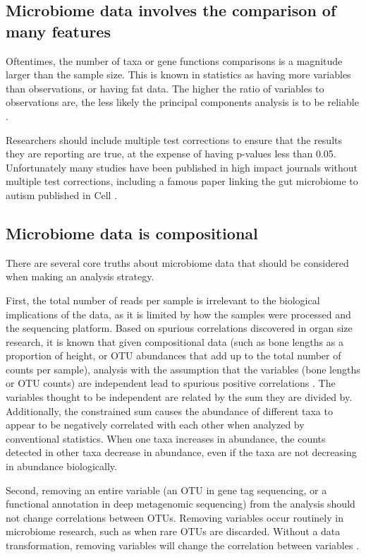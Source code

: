 \subsection{Microbiome data involves the comparison of many features}
Oftentimes, the number of taxa or gene functions comparisons is a magnitude larger than the sample size. This is known in statistics as having more variables than observations, or having fat data. The higher the ratio of variables to observations are, the less likely the principal components analysis is to be reliable \cite{osborne2004sample}.

Researchers should include multiple test corrections to ensure that the results they are reporting are true, at the expense of having p-values less than 0.05. Unfortunately many studies have been published in high impact journals without multiple test corrections, including a famous paper linking the gut microbiome to autism published in Cell \cite{hsiao2013microbiota}.

\subsection{Microbiome data is compositional}
There are several core truths about microbiome data that should be considered when making an analysis strategy.

First, the total number of reads per sample is irrelevant to the biological implications of the data, as it is limited by how the samples were processed and the sequencing platform. Based on spurious correlations discovered in organ size research, it is known that given compositional data (such as bone lengths as a proportion of height, or OTU abundances that add up to the total number of counts per sample), analysis with the assumption that the variables (bone lengths or OTU counts) are independent lead to spurious positive correlations \cite{pearson1896mathematical}. The variables thought to be independent are related by the sum they are divided by. Additionally, the constrained sum causes the abundance of different taxa to appear to be negatively correlated with each other when analyzed by conventional statistics. When one taxa increases in abundance, the counts detected in other taxa decrease in abundance, even if the taxa are not decreasing in abundance biologically.

Second, removing an entire variable (an OTU in gene tag sequencing, or a functional annotation in deep metagenomic sequencing) from the analysis should not change correlations between OTUs. Removing variables occur routinely in microbiome research, such as when rare OTUs are discarded. Without a data transformation, removing variables will change the correlation between variables \cite{aitchison1982statistical}.

